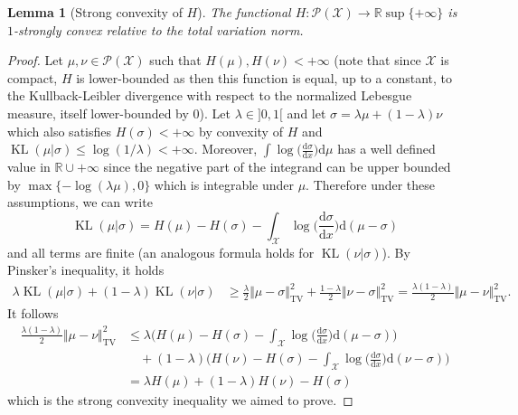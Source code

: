 \documentclass[11pt]{article}
\newcommand{\RR}{\mathbb{R}}
\newcommand{\Pp}{\mathcal{P}}
\newcommand{\Xx}{\mathcal{X}}
\renewcommand{\d}{\mathrm{d}}
\newcommand{\TV}{\mathrm{TV}}
\DeclareMathOperator{\KL}{KL}
\newtheorem{lemma}[theorem]{Lemma}
\begin{document}
\begin{lemma}[Strong convexity of $H$]\label{lem:H-strongly-convex}
The functional $H:\Pp(\Xx)\to \RR\sup \{+\infty\}$ is $1$-strongly convex relative to the total variation norm.
\end{lemma}
\begin{proof}
Let $\mu,\nu\in \Pp(\Xx)$ such that $H(\mu),H(\nu)<+\infty$ (note that since $\Xx$ is compact, $H$ is lower-bounded as then this function is equal, up to a constant, to the Kullback-Leibler divergence with respect to the normalized Lebesgue measure, itself lower-bounded by $0$). Let $\lambda\in {]0,1[}$ and let $\sigma=\lambda \mu+(1-\lambda)\nu$ which also satisfies $H(\sigma)<+\infty$ by convexity of $H$ and $\KL(\mu|\sigma)\leq \log(1/\lambda)<+\infty$. Moreover, $\int \log\Big(\frac{\d\sigma}{\d x}\Big)\d\mu$ has a well defined value in $\RR \cup {+\infty}$ since the negative part of the integrand can be upper bounded by $\max\{-\log(\lambda \mu),0\}$ which is integrable under $\mu$. Therefore under these assumptions, we can write
$$
\KL(\mu|\sigma) = H(\mu)-H(\sigma) -\int_\Xx \log\Big(\frac{\d\sigma}{\d x}\Big)\d(\mu-\sigma)
$$
and all terms are finite (an analogous formula holds for $\KL(\nu|\sigma)$). By Pinsker's inequality, it holds
\begin{align*}
\lambda \KL(\mu|\sigma) + (1-\lambda) \KL(\nu|\sigma) &\geq \frac{\lambda}{2} \Vert \mu-\sigma\Vert^2_\TV+ \frac{1-\lambda}{2} \Vert \nu-\sigma\Vert^2_\TV = \frac{\lambda(1-\lambda)}{2}\Vert \mu-\nu\Vert^2_\TV.
\end{align*}
It follows
\begin{align*}
\frac{\lambda(1-\lambda)}{2}\Vert \mu-\nu\Vert^2_\TV&\leq \lambda \Big(H(\mu)-H(\sigma) -\int_\Xx \log\Big(\frac{\d\sigma}{\d x}\Big)\d(\mu-\sigma)\Big)\\
&\quad + (1-\lambda) \Big(H(\nu)-H(\sigma) -\int_\Xx \log\Big(\frac{\d\sigma}{\d x}\Big)\d(\nu-\sigma)\Big)\\
&= \lambda H(\mu) +(1-\lambda) H(\nu) - H(\sigma)
\end{align*}
which is the strong convexity inequality we aimed to prove.
\end{proof}
\end{document}

